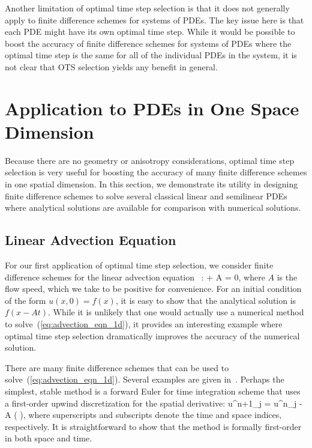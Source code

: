 \documentclass[oneeqnum,onefignum,onetabnum,onethmnum]{siamltex}
\begin{document}
Another limitation of optimal time step selection is that it does not 
generally apply to finite difference schemes for systems of PDEs.  The 
key issue here is that each PDE might have its own optimal time step.  While 
it would be possible to boost the accuracy of finite difference schemes for 
systems of PDEs where the optimal time step is the same for all of the 
individual PDEs in the system, it is not clear that OTS selection yields any 
benefit in general.


\section{\label{sec:applications_1d} 
         Application to PDEs in One Space Dimension}
Because there are no geometry or anisotropy considerations, optimal time step 
selection is very useful for boosting the accuracy of many finite difference 
schemes in one spatial dimension.  In this section, we demonstrate its 
utility in designing finite difference schemes to solve several classical 
linear and semilinear PDEs where analytical solutions are available for 
comparison with numerical solutions.


\subsection{Linear Advection Equation}
For our first application of optimal time step selection, we consider 
finite difference schemes for the linear advection equation
~\cite{leveque_book_1992, leveque_book_2002, gko_book}:
\beq
   + A  = 0,
  \label{eq:advection_eqn_1d}
\eeq
where $A$ is the flow speed, which we take to be positive for convenience.  
For an initial condition of the form $u(x,0) = f(x)$, it is easy to show 
that the analytical solution is $f(x-At)$.  While it is unlikely that one 
would actually use a numerical method to solve~(\ref{eq:advection_eqn_1d}), 
it provides an interesting example where optimal time step selection 
dramatically improves the accuracy of the numerical solution.

There are many finite difference schemes that can be used to 
solve~(\ref{eq:advection_eqn_1d}).  Several examples are given 
in~\cite{leveque_book_1992}.  Perhaps the simplest, stable method is a 
forward Euler for time integration scheme that uses a first-order upwind 
discretization for the spatial derivative:
\beq
  u^{n+1}_j = u^{n}_j 
  - A \dt \left(  \right),
  \label{eq:advection_eqn_1d_FD_scheme}
\eeq
where superscripts and subscripts denote the time and space indices, 
respectively.  It is straightforward to show that the method is formally 
first-order in both space and time.  
\end{document}
